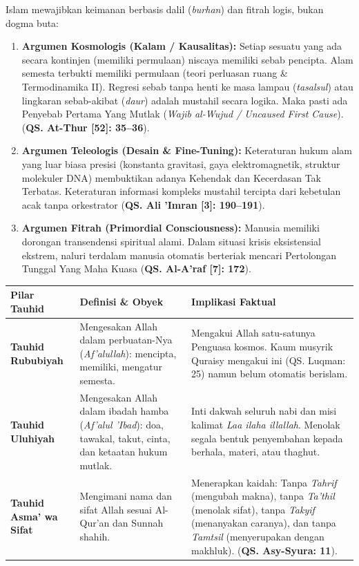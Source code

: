 \documentclass[10pt,a4paper]{article}
\begin{document}
\begin{conceptbox}
Islam mewajibkan keimanan berbasis dalil (\textit{burhan}) dan fitrah logis, bukan dogma buta:
\begin{enumerate}
  \item \textbf{Argumen Kosmologis (Kalam / Kausalitas):} Setiap sesuatu yang ada secara kontinjen (memiliki permulaan) niscaya memiliki sebab pencipta. Alam semesta terbukti memiliki permulaan (teori perluasan ruang \& Termodinamika II). Regresi sebab tanpa henti ke masa lampau (\textit{tasalsul}) atau lingkaran sebab-akibat (\textit{daur}) adalah mustahil secara logika. Maka pasti ada Penyebab Pertama Yang Mutlak (\textit{Wajib al-Wujud / Uncaused First Cause}). (\textbf{QS. At-Thur [52]: 35--36}).
  \item \textbf{Argumen Teleologis (Desain \& Fine-Tuning):} Keteraturan hukum alam yang luar biasa presisi (konstanta gravitasi, gaya elektromagnetik, struktur molekuler DNA) membuktikan adanya Kehendak dan Kecerdasan Tak Terbatas. Keteraturan informasi kompleks mustahil tercipta dari kebetulan acak tanpa orkestrator (\textbf{QS. Ali 'Imran [3]: 190--191}).
  \item \textbf{Argumen Fitrah (Primordial Consciousness):} Manusia memiliki dorongan transendensi spiritual alami. Dalam situasi krisis eksistensial ekstrem, naluri terdalam manusia otomatis berteriak mencari Pertolongan Tunggal Yang Maha Kuasa (\textbf{QS. Al-A'raf [7]: 172}).
\end{enumerate}
\end{conceptbox}

\begin{conceptbox}
\begin{tabularx}{\textwidth}{l Y Y}
\toprule
\textbf{Pilar Tauhid} & \textbf{Definisi \& Obyek} & \textbf{Implikasi Faktual} \\
\midrule
\textbf{Tauhid Rububiyah} & Mengesakan Allah dalam perbuatan-Nya (\textit{Af'alullah}): mencipta, memiliki, mengatur semesta. & Mengakui Allah satu-satunya Penguasa kosmos. Kaum musyrik Quraisy mengakui ini (QS. Luqman: 25) namun belum otomatis berislam. \\
\addlinespace
\textbf{Tauhid Uluhiyah} & Mengesakan Allah dalam ibadah hamba (\textit{Af'alul 'Ibad}): doa, tawakal, takut, cinta, dan ketaatan hukum mutlak. & Inti dakwah seluruh nabi dan misi kalimat \textit{Laa ilaha illallah}. Menolak segala bentuk penyembahan kepada berhala, materi, atau thaghut. \\
\addlinespace
\textbf{Tauhid Asma' wa Sifat} & Mengimani nama dan sifat Allah sesuai Al-Qur'an dan Sunnah shahih. & Menerapkan kaidah: Tanpa \textit{Tahrif} (mengubah makna), tanpa \textit{Ta'thil} (menolak sifat), tanpa \textit{Takyif} (menanyakan caranya), dan tanpa \textit{Tamtsil} (menyerupakan dengan makhluk). (\textbf{QS. Asy-Syura: 11}). \\
\bottomrule
\end{tabularx}
\end{conceptbox}
\end{document}
